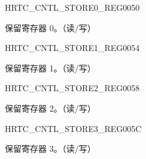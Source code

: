 \begin{register}{H}{RTC\_CNTL\_STORE0\_REG}{\hexprefix{}0050}\label{regdesc:RTCCNTLSTORE0REG}
%
\regnewline%
\begin{regdesc}\begin{reglist}
\label{fielddesc:RTCCNTLRTCSCRATCH0}\item [RTC\_CNTL\_RTC\_SCRATCH0] 保留寄存器 0。（读/写）
\end{reglist}\end{regdesc}
\end{register}


\begin{register}{H}{RTC\_CNTL\_STORE1\_REG}{\hexprefix{}0054}\label{regdesc:RTCCNTLSTORE1REG}
%
\regnewline%
\begin{regdesc}\begin{reglist}
\label{fielddesc:RTCCNTLRTCSCRATCH1}\item [RTC\_CNTL\_RTC\_SCRATCH1] 保留寄存器 1。（读/写）
\end{reglist}\end{regdesc}
\end{register}


\begin{register}{H}{RTC\_CNTL\_STORE2\_REG}{\hexprefix{}0058}\label{regdesc:RTCCNTLSTORE2REG}
%
\regnewline%
\begin{regdesc}\begin{reglist}
\label{fielddesc:RTCCNTLRTCSCRATCH2}\item [RTC\_CNTL\_RTC\_SCRATCH2] 保留寄存器 2。（读/写）
\end{reglist}\end{regdesc}
\end{register}


\begin{register}{H}{RTC\_CNTL\_STORE3\_REG}{\hexprefix{}005C}\label{regdesc:RTCCNTLSTORE3REG}
%
\regnewline%
\begin{regdesc}\begin{reglist}
\label{fielddesc:RTCCNTLRTCSCRATCH3}\item [RTC\_CNTL\_RTC\_SCRATCH3] 保留寄存器 3。（读/写）
\end{reglist}\end{regdesc}
\end{register}



